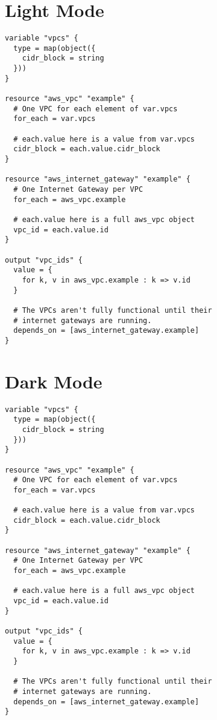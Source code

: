 \documentclass[dvipdfmx,uplatex,a4paper]{article}
\begin{document}
\section*{Light Mode}
\begin{lstlisting}[language=HCL,style=light]
variable "vpcs" {
  type = map(object({
    cidr_block = string
  }))
}

resource "aws_vpc" "example" {
  # One VPC for each element of var.vpcs
  for_each = var.vpcs

  # each.value here is a value from var.vpcs
  cidr_block = each.value.cidr_block
}

resource "aws_internet_gateway" "example" {
  # One Internet Gateway per VPC
  for_each = aws_vpc.example

  # each.value here is a full aws_vpc object
  vpc_id = each.value.id
}

output "vpc_ids" {
  value = {
    for k, v in aws_vpc.example : k => v.id
  }

  # The VPCs aren't fully functional until their
  # internet gateways are running.
  depends_on = [aws_internet_gateway.example]
}
\end{lstlisting}

\newpage

\section*{Dark Mode}
\begin{lstlisting}[language=HCL,style=dark]
variable "vpcs" {
  type = map(object({
    cidr_block = string
  }))
}

resource "aws_vpc" "example" {
  # One VPC for each element of var.vpcs
  for_each = var.vpcs

  # each.value here is a value from var.vpcs
  cidr_block = each.value.cidr_block
}

resource "aws_internet_gateway" "example" {
  # One Internet Gateway per VPC
  for_each = aws_vpc.example

  # each.value here is a full aws_vpc object
  vpc_id = each.value.id
}

output "vpc_ids" {
  value = {
    for k, v in aws_vpc.example : k => v.id
  }

  # The VPCs aren't fully functional until their
  # internet gateways are running.
  depends_on = [aws_internet_gateway.example]
}
\end{lstlisting}
\end{document}
